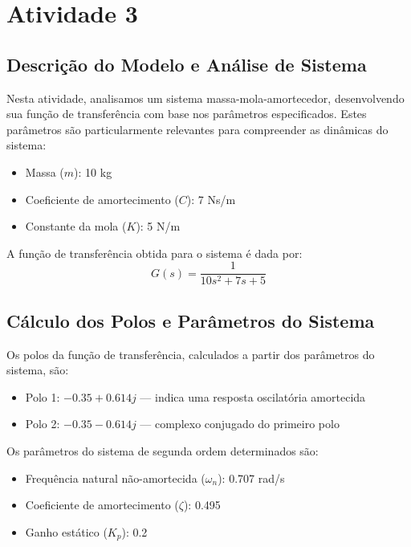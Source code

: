 \section{Atividade 3}

\subsection{Descrição do Modelo e Análise de Sistema}
Nesta atividade, analisamos um sistema massa-mola-amortecedor, desenvolvendo sua função de transferência com base nos parâmetros especificados. Estes parâmetros são particularmente relevantes para compreender as dinâmicas do sistema:
\begin{itemize}
    \item Massa (\( m \)): 10 kg
    \item Coeficiente de amortecimento (\( C \)): 7 Ns/m
    \item Constante da mola (\( K \)): 5 N/m
\end{itemize}
A função de transferência obtida para o sistema é dada por:
\[
    G(s) = \frac{1}{10s^2 + 7s + 5}
\]

\subsection{Cálculo dos Polos e Parâmetros do Sistema}
Os polos da função de transferência, calculados a partir dos parâmetros do sistema, são:
\begin{itemize}
    \item Polo 1: \( -0.35 + 0.614j \) — indica uma resposta oscilatória amortecida
    \item Polo 2: \( -0.35 - 0.614j \) — complexo conjugado do primeiro polo
\end{itemize}

Os parâmetros do sistema de segunda ordem determinados são:
\begin{itemize}
    \item Frequência natural não-amortecida (\( \omega_n \)): 0.707 rad/s
    \item Coeficiente de amortecimento (\( \zeta \)): 0.495
    \item Ganho estático (\( K_p \)): 0.2
\end{itemize}

